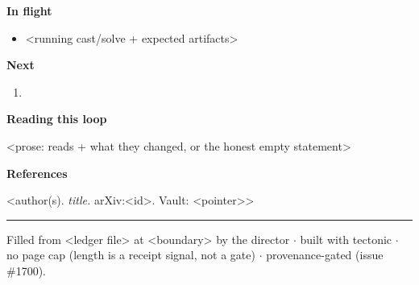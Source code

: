 \documentclass[10pt]{article}
\newcommand{\sect}[1]{\vspace{10pt}\textbf{#1}\par\vspace{3pt}}
\begin{document}
\sect{In flight}
\begin{itemize}
  \item <running cast/solve + expected artifacts>
\end{itemize}

\sect{Next}
\begin{enumerate}
  \item <next queued work, one line each>
\end{enumerate}

\sect{Reading this loop}
<prose: reads + what they changed, or the honest empty statement>

\sect{References}
\begin{enumerate}[label={[\arabic*]},leftmargin=2.2em]
  \item <author(s). \emph{title.} arXiv:<id>. Vault: <pointer>>
\end{enumerate}

\vspace{8pt}
\hrule
\vspace{2pt}
{\footnotesize\color{gray} Filled from <ledger file> at <boundary> by the
director $\cdot$ built with tectonic $\cdot$ no page cap (length is a
receipt signal, not a gate) $\cdot$ provenance-gated (issue \#1700).}
\end{document}

